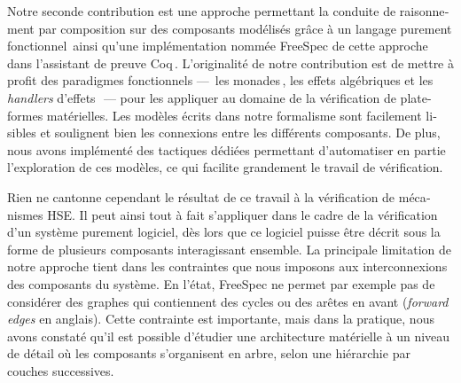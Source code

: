 \begin{otherlanguage}{french}
  Notre seconde contribution est une approche permettant la conduite de
  raisonnement par composition sur des composants modélisés grâce à un langage
  purement fonctionnel\,\cite{letan2018freespec} ainsi qu’une implémentation
  nommée FreeSpec de cette approche\,\cite{letan2018freespeccode} dans
  l’assistant de preuve Coq\,\cite{coq}.
  L’originalité de notre contribution est de mettre à profit des paradigmes
  fonctionnels ---~les monades\,\cite{jones2005io}, les effets algébriques et
  les \emph{handlers} d’effets\,\cite{bauer2015effects}~--- pour les appliquer
  au domaine de la vérification de plate-formes matérielles.
  Les modèles écrits dans notre formalisme sont facilement lisibles et soulignent bien les
  connexions entre les différents composants.
  De plus, nous avons implémenté des tactiques dédiées permettant d’automatiser
  en partie l’exploration de ces modèles, ce qui facilite grandement le travail
  de vérification.

  Rien ne cantonne cependant le résultat de ce travail à la vérification de mécanismes HSE. 
  Il peut ainsi tout à fait s’appliquer dans le cadre de la
  vérification d’un système purement logiciel, dès lors que ce logiciel puisse être décrit sous la forme de
   plusieurs composants interagissant ensemble.
  La principale limitation de notre approche tient dans les contraintes que nous
  imposons aux interconnexions des composants du système.
  En l’état, FreeSpec ne permet par exemple pas de considérer des graphes qui
  contiennent des cycles ou des \og{} arêtes en avant \fg{} (\emph{forward
    edges} en anglais).
  Cette contrainte est importante, mais dans la pratique, nous avons constaté
  qu’il est possible d’étudier une architecture matérielle à un niveau de détail
  où les composants s’organisent en arbre, selon une hiérarchie par couches
  successives.


\end{otherlanguage}
